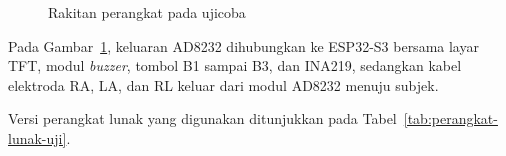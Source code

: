 \begin{figure}[!ht]
  \centering
  \caption{Rakitan perangkat pada ujicoba}
  \label{fig:4-foto-rakitan}
\end{figure}

Pada Gambar~\ref{fig:4-foto-rakitan}, keluaran AD8232 dihubungkan ke ESP32-S3 bersama layar TFT, modul \textit{buzzer}, tombol B1 sampai B3, dan INA219, sedangkan kabel elektroda RA, LA, dan RL keluar dari modul AD8232 menuju subjek.

Versi perangkat lunak yang digunakan ditunjukkan pada Tabel~\ref{tab:perangkat-lunak-uji}.

